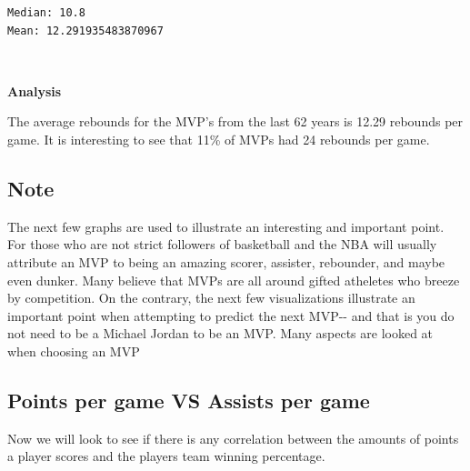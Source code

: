 \documentclass[11pt]{article}
\begin{document}
    \begin{Verbatim}[commandchars=\\\{\}]
Median: 10.8
Mean: 12.291935483870967

    \end{Verbatim}

    \begin{center}
    \end{center}
    { \hspace*{\fill} \\}
    
    \textbf{Analysis} \newline

The average rebounds for the MVP's from the last 62 years is 12.29
rebounds per game. It is interesting to see that 11\% of MVPs had 24
rebounds per game.\\
\newline
\newline

\subsection{Note}\label{note}

The next few graphs are used to illustrate an interesting and important
point. For those who are not strict followers of basketball and the NBA
will usually attribute an MVP to being an amazing scorer, assister,
rebounder, and maybe even dunker. Many believe that MVPs are all around
gifted atheletes who breeze by competition. On the contrary, the next
few visualizations illustrate an important point when attempting to
predict the next MVP-\/- and that is you do not need to be a Michael
Jordan to be an MVP. Many aspects are looked at when choosing an MVP

\subsection{Points per game VS Assists per
game}\label{points-per-game-vs-assists-per-game}

Now we will look to see if there is any correlation between the amounts
of points a player scores and the players team winning percentage.
\end{document}
